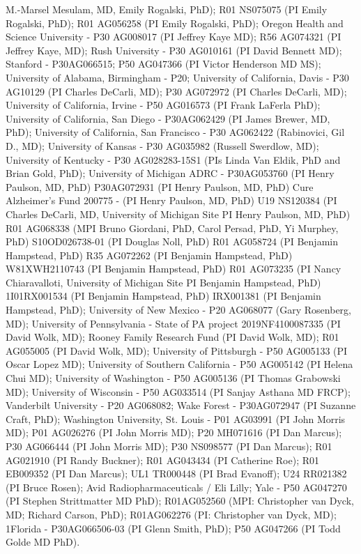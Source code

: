 \documentclass[conference]{IEEEtran}
\begin{document}
M.-Marsel Mesulam, MD, Emily Rogalski, PhD); R01 NS075075 (PI Emily Rogalski, PhD); R01 AG056258 (PI Emily Rogalski, PhD); Oregon Health and Science University - P30 AG008017 (PI Jeffrey Kaye MD); R56 AG074321 (PI Jeffrey Kaye, MD); Rush University - P30 AG010161 (PI David Bennett MD); Stanford - P30AG066515; P50 AG047366 (PI Victor Henderson MD MS); University of Alabama, Birmingham - P20; University of California, Davis - P30 AG10129 (PI Charles DeCarli, MD); P30 AG072972 (PI Charles DeCarli, MD); University of California, Irvine - P50 AG016573 (PI Frank LaFerla PhD); University of California, San Diego - P30AG062429 (PI James Brewer, MD, PhD); University of California, San Francisco - P30 AG062422 (Rabinovici, Gil D., MD); University of Kansas - P30 AG035982 (Russell Swerdlow, MD); University of Kentucky - P30 AG028283-15S1 (PIs Linda Van Eldik, PhD and Brian Gold, PhD); University of Michigan ADRC - P30AG053760 (PI Henry Paulson, MD, PhD) P30AG072931 (PI Henry Paulson, MD, PhD) Cure Alzheimer's Fund 200775 - (PI Henry Paulson, MD, PhD) U19 NS120384 (PI Charles DeCarli, MD, University of Michigan Site PI Henry Paulson, MD, PhD) R01 AG068338 (MPI Bruno Giordani, PhD, Carol Persad, PhD, Yi Murphey, PhD) S10OD026738-01 (PI Douglas Noll, PhD) R01 AG058724 (PI Benjamin Hampstead, PhD) R35 AG072262 (PI Benjamin Hampstead, PhD) W81XWH2110743 (PI Benjamin Hampstead, PhD) R01 AG073235 (PI Nancy Chiaravalloti, University of Michigan Site PI Benjamin Hampstead, PhD) 1I01RX001534 (PI Benjamin Hampstead, PhD) IRX001381 (PI Benjamin Hampstead, PhD); University of New Mexico - P20 AG068077 (Gary Rosenberg, MD); University of Pennsylvania - State of PA project 2019NF4100087335 (PI David Wolk, MD); Rooney Family Research Fund (PI David Wolk, MD); R01 AG055005 (PI David Wolk, MD); University of Pittsburgh - P50 AG005133 (PI Oscar Lopez MD); University of Southern California - P50 AG005142 (PI Helena Chui MD); University of Washington - P50 AG005136 (PI Thomas Grabowski MD); University of Wisconsin - P50 AG033514 (PI Sanjay Asthana MD FRCP); Vanderbilt University - P20 AG068082; Wake Forest - P30AG072947 (PI Suzanne Craft, PhD); Washington University, St. Louis - P01 AG03991 (PI John Morris MD); P01 AG026276 (PI John Morris MD); P20 MH071616 (PI Dan Marcus); P30 AG066444 (PI John Morris MD); P30 NS098577 (PI Dan Marcus); R01 AG021910 (PI Randy Buckner); R01 AG043434 (PI Catherine Roe); R01 EB009352 (PI Dan Marcus); UL1 TR000448 (PI Brad Evanoff); U24 RR021382 (PI Bruce Rosen); Avid Radiopharmaceuticals / Eli Lilly; Yale - P50 AG047270 (PI Stephen Strittmatter MD PhD); R01AG052560 (MPI: Christopher van Dyck, MD; Richard Carson, PhD); R01AG062276 (PI: Christopher van Dyck, MD); 1Florida - P30AG066506-03 (PI Glenn Smith, PhD); P50 AG047266 (PI Todd Golde MD PhD).
\end{document}
